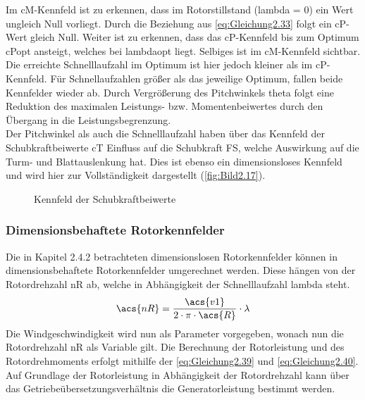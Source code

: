 Im \acs{cM}-Kennfeld ist zu erkennen, dass im Rotorstillstand (\acs{lambda} = 0) ein Wert ungleich Null vorliegt. Durch die Beziehung aus \autoref{eq:Gleichung2.33} folgt ein \acs{cP}-Wert gleich Null. Weiter ist zu erkennen, dass das \acs{cP}-Kennfeld bis zum Optimum \acs{cPopt} ansteigt, welches bei \acs{lambdaopt} liegt. Selbiges ist im \acs{cM}-Kennfeld sichtbar. Die erreichte Schnelllaufzahl im Optimum ist hier jedoch kleiner als im \acs{cP}-Kennfeld. Für Schnellaufzahlen größer als das jeweilige Optimum, fallen beide Kennfelder wieder ab. Durch Vergrößerung des Pitchwinkels \acs{theta} folgt eine Reduktion des maximalen Leistungs- bzw. Momentenbeiwertes durch den Übergang in die Leistungsbegrenzung.\\
Der Pitchwinkel als auch die Schnelllaufzahl haben über das Kennfeld der Schubkraftbeiwerte \acs{cT} Einfluss auf die Schubkraft \acs{FS}, welche Auswirkung auf die Turm- und Blattauslenkung hat. Dies ist ebenso ein dimensionsloses Kennfeld und wird hier zur Vollständigkeit dargestellt (\autoref{fig:Bild2.17}).
\begin{figure}[H]
   \centering
   \caption[Kennfeld der Schubkraftbeiwerte]{Kennfeld der Schubkraftbeiwerte}
   \label{fig:Bild2.17}
\end{figure}

\subsubsection{Dimensionsbehaftete Rotorkennfelder}
Die in Kapitel 2.4.2 betrachteten dimensionslosen Rotorkennfelder können in dimensionsbehaftete Rotorkennfelder umgerechnet werden. Diese hängen von der Rotordrehzahl \acs{nR} ab, welche in Abhängigkeit der Schnelllaufzahl \acs{lambda} steht.
\begin{align*}
    \acs{nR} = \frac{\acs{v1}}{2\cdot\pi\cdot \acs{R}}\cdot\lambda
\end{align*}
\newline
Die Windgeschwindigkeit wird nun als Parameter vorgegeben, wonach nun die Rotordrehzahl \acs{nR} als Variable gilt. Die Berechnung der Rotorleistung und des Rotordrehmoments erfolgt mithilfe der \autoref{eq:Gleichung2.39} und \autoref{eq:Gleichung2.40}. Auf Grundlage der Rotorleistung in Abhängigkeit der Rotordrehzahl kann über das Getriebeübersetzungsverhältnis die Generatorleistung bestimmt werden.

